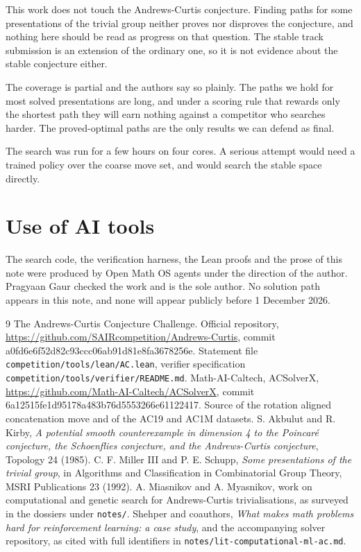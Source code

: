 \documentclass[11pt]{article}
\begin{document}
This work does not touch the Andrews-Curtis conjecture. Finding paths for some presentations of the trivial group neither proves nor disproves the conjecture, and nothing here should be read as progress on that question. The stable track submission is an extension of the ordinary one, so it is not evidence about the stable conjecture either.

The coverage is partial and the authors say so plainly. The paths we hold for most solved presentations are long, and under a scoring rule that rewards only the shortest path they will earn nothing against a competitor who searches harder. The proved-optimal paths are the only results we can defend as final.

The search was run for a few hours on four cores. A serious attempt would need a trained policy over the coarse move set, and would search the stable space directly.

\section{Use of AI tools}

The search code, the verification harness, the Lean proofs and the prose of this note were produced by Open Math OS agents under the direction of the author. Pragyaan Gaur checked the work and is the sole author. No solution path appears in this note, and none will appear publicly before 1 December 2026.

\begin{thebibliography}{9}
 The Andrews-Curtis Conjecture Challenge. Official repository, \url{https://github.com/SAIRcompetition/Andrews-Curtis}, commit a0fd6e6f52d82c93ccc06ab91d81e8fa3678256e. Statement file \texttt{competition/tools/lean/AC.lean}, verifier specification \texttt{competition/tools/verifier/README.md}.
 Math-AI-Caltech, ACSolverX, \url{https://github.com/Math-AI-Caltech/ACSolverX}, commit 6a12515fe1d95178a483b76d5553266e61122417. Source of the rotation aligned concatenation move and of the AC19 and AC1M datasets.
 S. Akbulut and R. Kirby, \emph{A potential smooth counterexample in dimension 4 to the Poincar\'e conjecture, the Schoenflies conjecture, and the Andrews-Curtis conjecture}, Topology 24 (1985).
 C. F. Miller III and P. E. Schupp, \emph{Some presentations of the trivial group}, in Algorithms and Classification in Combinatorial Group Theory, MSRI Publications 23 (1992).
 A. Miasnikov and A. Myasnikov, work on computational and genetic search for Andrews-Curtis trivialisations, as surveyed in the dossiers under \texttt{notes/}.
 Shehper and coauthors, \emph{What makes math problems hard for reinforcement learning: a case study}, and the accompanying solver repository, as cited with full identifiers in \texttt{notes/lit-computational-ml-ac.md}.
\end{thebibliography}
\end{document}
